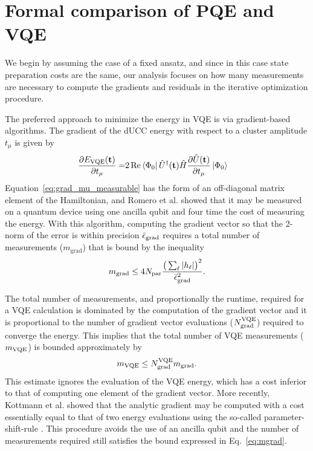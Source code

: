 \documentclass[aps,prx, reprint]{revtex4-2}
\newcommand*{\qucc}{dUCC\xspace}
\begin{document}
\section{Formal comparison of PQE and VQE}
\label{sec:formal_vqe_compare}

We begin by assuming the case of a fixed ansatz, and since in this case state preparation costs are the same, our analysis focuses on how many measurements are necessary to compute the gradients and residuals in the iterative optimization procedure.

The preferred approach to minimize the energy in VQE is via gradient-based algorithms.
The gradient of the \qucc  energy with respect to a cluster amplitude $t_\mu$ is given by
\begin{equation}
\begin{split}
\frac{\partial E_\mathrm{VQE}(\mathbf{t})}{\partial t_\mu} = &
2 \, \mathrm{Re} \bra{\Phi_0}  \hat{U}^\dagger(\mathbf{t}) \hat{H} \frac{\partial \hat{U}(\mathbf{t})}{\partial t_\mu}  \ket{\Phi_0}
\label{eq:grad_mu_measurable}
\end{split}
\end{equation}
Equation~\eqref{eq:grad_mu_measurable} has the form of an off-diagonal matrix element of the Hamiltonian, and Romero et al. \cite{Romero:2019hk} showed that it may be measured on a quantum device using one ancilla qubit and four time the cost of measuring the energy.
With this algorithm, computing the gradient vector so that the 2-norm of the error is within precision $\bar{\epsilon}_{\rm{grad}}$ requires a total number of measurements ($m_\text{grad}$) that is bound by the inequality \cite{Romero:2019hk}
\begin{equation}
\label{eq:mgrad}
m_\text{grad} \leq 4 N_{\rm{par}} \frac{ \big( \sum_\ell | h_\ell | \big)^2 }{ \bar{\epsilon}_{\rm{grad}}^2  }.
\end{equation}

The total number of measurements, and proportionally the runtime, required for a VQE calculation is dominated by the computation of the gradient vector and it is proportional to the number of gradient vector evaluations ($N_{\rm{grad}}^{\rm{VQE}}$) required to converge the energy. This implies that the total number of VQE measurements ($m_{\rm{VQE}} $) is bounded approximately by
\begin{equation}
m_{\rm{VQE}} \leq N_{\rm{grad}}^{\rm{VQE}} m_\text{grad}.
\end{equation}
This estimate ignores the evaluation of the VQE energy, which has a cost inferior to that of computing one element of the gradient vector.
More recently, Kottmann et al. \cite{kottmann2020feasible} showed that the analytic gradient may be computed with a cost essentially equal to that of two energy evaluations using the so-called  parameter-shift-rule \cite{schuld2019evaluating}.
This procedure avoids the use of an ancilla qubit and the number of measurements required still satisfies the bound expressed in Eq.~\eqref{eq:mgrad}.
\end{document}
